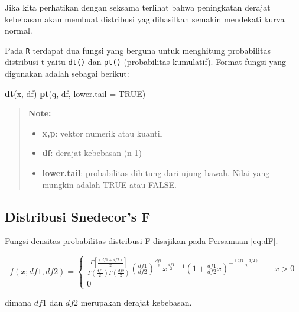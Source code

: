 \documentclass[]{book}
\newenvironment{Shaded}{\begin{snugshade}}{\end{snugshade}}
\newcommand{\KeywordTok}[1]{\textcolor[rgb]{0.13,0.29,0.53}{\textbf{#1}}}
\newcommand{\DataTypeTok}[1]{\textcolor[rgb]{0.13,0.29,0.53}{#1}}
\newcommand{\OtherTok}[1]{\textcolor[rgb]{0.56,0.35,0.01}{#1}}
\newcommand{\NormalTok}[1]{#1}
\providecommand{\tightlist}{%
  \setlength{\itemsep}{0pt}\setlength{\parskip}{0pt}}
\begin{document}
Jika kita perhatikan dengan seksama terlihat bahwa peningkatan derajat
kebebasan akan membuat distribusi yag dihasilkan semakin mendekati kurva
normal.

Pada \texttt{R} terdapat dua fungsi yang berguna untuk menghitung
probabilitas distribusi t yaitu \texttt{dt()} dan \texttt{pt()}
(probabilitas kumulatif). Format fungsi yang digunakan adalah sebagai
berikut:

\begin{Shaded}
\begin{Highlighting}[]
\KeywordTok{dt}\NormalTok{(x, df)}
\KeywordTok{pt}\NormalTok{(q, df, }\DataTypeTok{lower.tail =} \OtherTok{TRUE}\NormalTok{)}
\end{Highlighting}
\end{Shaded}

\begin{quote}
\textbf{Note: }

\begin{itemize}
\tightlist
\item
  \textbf{x,p}: vektor numerik atau kuantil
\item
  \textbf{df}: derajat kebebasan (n-1)
\item
  \textbf{lower.tail}: probabilitas dihitung dari ujung bawah. Nilai
  yang mungkin adalah TRUE atau FALSE.
\end{itemize}
\end{quote}

\subsection{Distribusi Snedecor's F}\label{distribusi-snedecors-f}

Fungsi densitas probabilitas distribusi F disajikan pada Persamaan
\eqref{eq:dF}.

\begin{equation}
f\left(x;df1,df2 \right) =
  \begin{cases}
    \frac{\Gamma\left[\frac{\left(df1+df2\right)}{2}\right]}{\Gamma\left(\frac{df1}{2}\right)\Gamma\left(\frac{df2}{2}\right)}\left(\frac{df1}{df2}\right)^{\frac{df1}{2}}x^{\frac{df1}{2}-1}\left(1+\frac{df1}{df2}x\right)^{-\frac{\left(df1+df2\right)}{2}}       & \quad x>0\\
    0                   & \quad\text{}
    \end{cases}
 \label{eq:dF}
\end{equation}

dimana \(df1\) dan \(df2\) merupakan derajat kebebasan.
\end{document}

